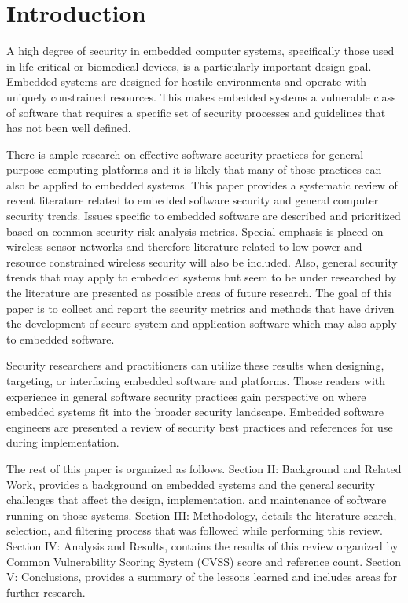 \documentclass[final,conference,11pt]{IEEEtran}
\begin{document}
\section{Introduction} 

A high degree of security in embedded computer systems, specifically those used in life critical or biomedical devices, is a particularly important design goal.  Embedded systems are designed for hostile environments and operate with uniquely constrained resources. This makes embedded systems a vulnerable class of software that requires a specific set of security processes and guidelines that has not been well defined.   

There is ample research on effective software security practices for general purpose computing platforms and it is likely that many of those practices can also be applied to embedded systems. This paper provides a systematic review of recent literature related to embedded software security and general computer security trends. Issues specific to embedded software are described and prioritized based on common security risk analysis metrics.  Special emphasis is placed on wireless sensor networks and therefore literature related to low power and resource constrained wireless security will also be included.  Also, general security trends that may apply to embedded systems but seem to be under researched by the literature are presented as possible areas of future research.  The goal of this paper is to collect and report the security metrics and methods that have driven the development of secure system and application software which may also apply to embedded software.

Security researchers and practitioners can utilize these results when designing, targeting, or interfacing embedded software and platforms.  Those readers with experience in general software security practices gain perspective on where embedded systems fit into the broader security landscape.  Embedded software engineers are presented a review of security best practices and references for use during implementation.

The rest of this paper is organized as follows. Section II: Background and Related Work, provides a background on embedded systems and the general security challenges that affect the design, implementation, and maintenance of software running on those systems. Section III: Methodology, details the literature search, selection, and filtering process that was followed while performing this review. Section IV: Analysis and Results, contains the results of this review organized by Common Vulnerability Scoring System (CVSS) score and reference count. Section V: Conclusions, provides a summary of the lessons learned and includes areas for further research.
\end{document}
